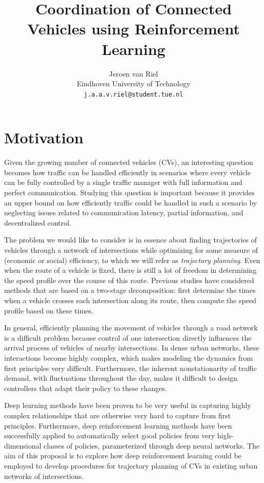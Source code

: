 \documentclass{article}
\title{Coordination of Connected Vehicles using Reinforcement Learning}
\author{
 Jeroen van Riel \\
Eindhoven University of Technology\\
  \texttt{j.a.a.v.riel@student.tue.nl} \\
}
\begin{document}
\maketitle


\section{Motivation}

Given the growing number of connected vehicles (CVs), an interesting question
becomes how traffic can be handled efficiently in scenarios where every vehicle
can be fully controlled by a single traffic manager with full information and
perfect communication. Studying this question is important because it provides
an upper bound on how efficiently traffic could be handled in such a scenario by
neglecting issues related to communication latency, partial information, and
decentralized control.

The problem we would like to consider is in essence about finding trajectories
of vehicles through a network of intersections while optimizing for some measure
of (economic or social) efficiency, to which we will refer as \textit{trajectory
  planning}. Even when the route of a vehicle is fixed, there is still a lot of
freedom in determining the speed profile over the course of this route. Previous
studies have considered methods that are based on a two-stage decomposition:
first determine the times when a vehicle crosses each intersection along its
route, then compute the speed profile based on these times.


In general, efficiently planning the movement of vehicles through a road network is
a difficult problem because control of one intersection directly influences the
arrival process of vehicles of nearby intersections. In dense urban networks,
these interactions become highly complex, which makes modeling the dynamics from
first principles very difficult. Furthermore, the inherent nonstationarity of
traffic demand, with fluctuations throughout the day, makes it difficult to
design controllers that adapt their policy to these changes.

Deep learning methods have been proven to be very useful in capturing highly
complex relationships that are otherwise very hard to capture from first
principles. Furthermore, deep reinforcement learning methods have been
successfully applied to automatically select good policies from very
high-dimensional classes of policies, parameterized through deep neural
networks. The aim of this proposal is to explore how deep reinforcement learning
could be employed to develop procedures for trajectory planning of CVs in
existing urban networks of intersections.
\end{document}
